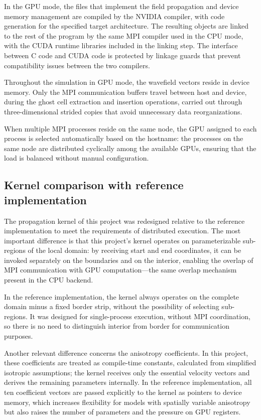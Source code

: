 \documentclass[cic,tc,english]{infufrgs}
\begin{document}
In the GPU mode, the files that implement the field propagation and
device memory management are compiled by the NVIDIA compiler, with
code generation for the specified target architecture. The resulting
objects are linked to the rest of the program by the same MPI compiler
used in the CPU mode, with the CUDA runtime libraries included in the
linking step. The interface between C code and CUDA code is protected
by linkage guards that prevent compatibility issues between the two
compilers.

Throughout the simulation in GPU mode, the wavefield vectors reside in
device memory. Only the MPI communication buffers travel between host
and device, during the ghost cell extraction and insertion operations,
carried out through three-dimensional strided copies that avoid
unnecessary data reorganizations.

When multiple MPI processes reside on the same node, the GPU assigned
to each process is selected automatically based on the hostname: the
processes on the same node are distributed cyclically among the
available GPUs, ensuring that the load is balanced without manual
configuration.

\subsection{Kernel comparison with reference implementation}
The propagation kernel of this project was redesigned relative to the
reference implementation to meet the requirements of distributed
execution. The most important difference is that this project's kernel
operates on parameterizable sub-regions of the local domain: by
receiving start and end coordinates, it can be invoked separately on
the boundaries and on the interior, enabling the overlap of MPI
communication with GPU computation---the same overlap mechanism present
in the CPU backend.

In the reference implementation, the kernel always operates on the
complete domain minus a fixed border strip, without the possibility of
selecting sub-regions. It was designed for single-process execution,
without MPI coordination, so there is no need to distinguish interior
from border for communication purposes.

Another relevant difference concerns the anisotropy coefficients. In
this project, these coefficients are treated as compile-time constants,
calculated from simplified isotropic assumptions; the kernel receives
only the essential velocity vectors and derives the remaining
parameters internally. In the reference implementation, all ten
coefficient vectors are passed explicitly to the kernel as pointers to
device memory, which increases flexibility for models with spatially
variable anisotropy but also raises the number of parameters and the
pressure on GPU registers.
\end{document}
